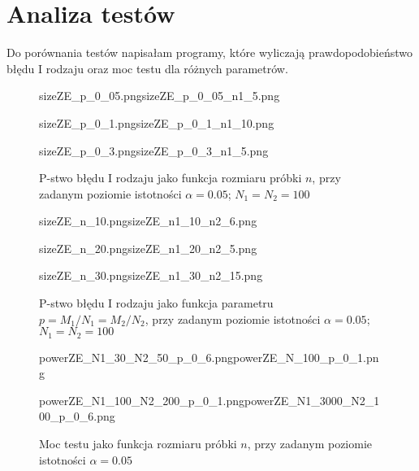 \chapter{Analiza testów}

Do porównania testów napisałam programy, które wyliczają prawdopodobieństwo błędu I rodzaju oraz moc testu dla różnych parametrów. 



\begin{figure}[!h]
	\begin{subdiagrams}{sizeZE_p_0_05.png}{sizeZE_p_0_05_n1_5.png}
	\end{subdiagrams}
	
	\begin{subdiagrams}{sizeZE_p_0_1.png}{sizeZE_p_0_1_n1_10.png}
	\end{subdiagrams}
	
	\begin{subdiagrams}{sizeZE_p_0_3.png}{sizeZE_p_0_3_n1_5.png}
	\end{subdiagrams}
	\caption{P-stwo błędu I rodzaju jako funkcja rozmiaru próbki $n$, przy zadanym poziomie istotności $\alpha=0.05$; $N_1=N_2=100$}
	\label{sizeZE_n}
\end{figure}


\begin{figure}[!h]
	\begin{subdiagrams}{sizeZE_n_10.png}{sizeZE_n1_10_n2_6.png}
	\end{subdiagrams}
	
	\begin{subdiagrams}{sizeZE_n_20.png}{sizeZE_n1_20_n2_5.png}
	\end{subdiagrams}
	
	\begin{subdiagrams}{sizeZE_n_30.png}{sizeZE_n1_30_n2_15.png}
	\end{subdiagrams}
	\caption{P-stwo błędu I rodzaju jako funkcja parametru $p=M_1/N_1=M_2/N_2$, przy zadanym poziomie istotności $\alpha=0.05$; $N_1=N_2=100$}
	\label{sizeZE_p}
\end{figure}

\begin{figure}[!h]
	\begin{subdiagrams}{powerZE_N1_30_N2_50_p_0_6.png}{powerZE_N_100_p_0_1.png}
	\end{subdiagrams}
	
	\begin{subdiagrams}{powerZE_N1_100_N2_200_p_0_1.png}{powerZE_N1_3000_N2_100_p_0_6.png}
	\end{subdiagrams}
	
	\caption{Moc testu jako funkcja rozmiaru próbki $n$, przy zadanym poziomie istotności $\alpha=0.05$}
	\label{powerZE_n}
\end{figure}